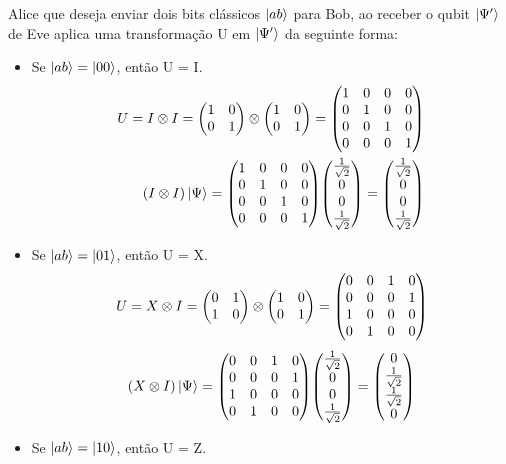 \documentclass[a4paper, 12pt, oneside]{book}
\begin{document}
Alice que deseja enviar dois bits clássicos $\ket{ab}$ para Bob, ao receber o qubit $\ket{\Psi'}$ de Eve aplica uma transformação U em $\ket{\Psi'}$ da seguinte forma:
\begin{itemize}
\item Se $\ket{ab}=\ket{00}$, então U = I.
\begin{align*}
U = I\otimes I = \mqty(1&0\\0&1)\otimes\mqty(1&0\\0&1) = 
	\mqty(1&0&0&0\\0&1&0&0\\0&0&1&0\\0&0&0&1) \\
(I\otimes I)\ket{\Psi} = \mqty(1&0&0&0\\0&1&0&0\\0&0&1&0\\0&0&0&1)
	\mqty(\frac{1}{\sqrt{2}}\\0\\ 0\\ \frac{1}{\sqrt{2}}) 
	= \mqty(\frac{1}{\sqrt{2}}\\0\\ 0\\ \frac{1}{\sqrt{2}}) 
\end{align*}
\item Se $\ket{ab}=\ket{01}$, então U = X.
\begin{align*}
U = X\otimes I = \mqty(0&1\\1&0)\otimes\mqty(1&0\\0&1) = 
	\mqty(0&0&1&0\\0&0&0&1\\1&0&0&0\\0&1&0&0) \\
\end{align*}	
\begin{align}
(X\otimes I)\ket{\Psi} =  \mqty(0&0&1&0\\0&0&0&1\\1&0&0&0\\0&1&0&0) 
	\mqty(\frac{1}{\sqrt{2}}\\0\\ 0\\ \frac{1}{\sqrt{2}}) 
	= \mqty(0\\ \frac{1}{\sqrt{2}}\\ \frac{1}{\sqrt{2}}\\ 0)\label{eq34}
\end{align}
\item Se $\ket{ab}=\ket{10}$, então U = Z.
\begin{align*}

\end{align*}
\end{itemize}
\end{document}
